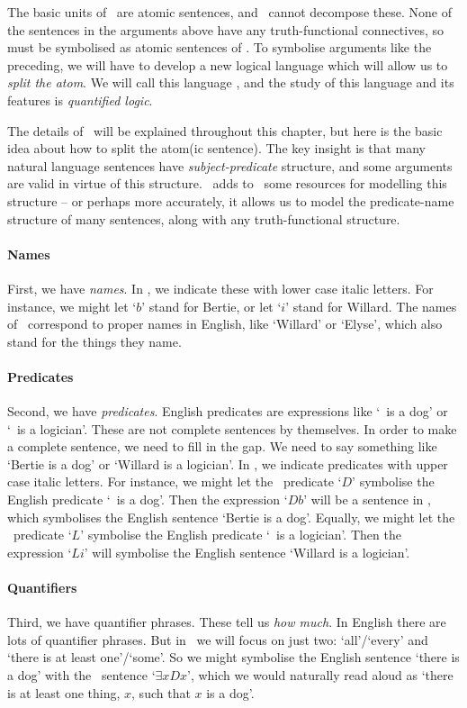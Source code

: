 The basic units of \TFL\ are atomic sentences, and \TFL\ cannot decompose these. None of the sentences in the arguments above have any truth-functional connectives, so must be symbolised as atomic sentences of \TFL. To symbolise arguments like the preceding, we will have to develop a new logical language which will allow us to \emph{split the atom}. We will call this language \FOL, and the study of this language and its features is \emph{quantified logic}. 

The details of \FOL\ will be explained throughout this chapter, but here is the basic idea about how to split the atom(ic sentence). The key insight is that many natural language sentences have \emph{subject-predicate} structure, and some arguments are valid in virtue of this structure. \FOL\ adds to \TFL\ some resources for modelling this structure – or perhaps more accurately, it allows us to model the predicate-name structure of many sentences, along with any truth-functional structure.

\paragraph{Names} First, we have \emph{names}. In \FOL, we indicate these with lower case italic letters. For instance, we might let `$b$' stand for Bertie, or let `$i$' stand for Willard. The names of \FOL\ correspond to proper names in English, like `Willard' or `Elyse', which also stand for the things they name. 

\paragraph{Predicates} Second, we have \emph{predicates}. English predicates are expressions like `\blank\ is a dog' or `\blank\ is a logician'. These are not complete sentences by themselves. In order to make a complete sentence, we need to fill in the gap. We need to say something like `Bertie is a dog' or `Willard is a logician'. In \FOL, we indicate predicates with upper case italic letters. For instance, we might let the \FOL\ predicate `$D$' symbolise the English predicate `\blank\ is a dog'. Then the expression `$Db$' will be a sentence in \FOL, which symbolises the English sentence `Bertie is a dog'. Equally, we might let the \FOL\ predicate `$L$' symbolise the English predicate `\blank\ is a logician'. Then the expression `$Li$' will symbolise the English sentence `Willard is a logician'.

\paragraph{Quantifiers} Third, we have quantifier phrases. These tell us \emph{how much}. In English there are lots of quantifier phrases. But in \FOL\ we will focus on just two:  `all'/`every' and `there is at least one'/`some'. So we might symbolise the English sentence `there is a dog' with the \FOL\ sentence `$\exists x Dx$', which we would naturally read aloud as `there is at least one thing, $x$, such that $x$ is a dog'.

